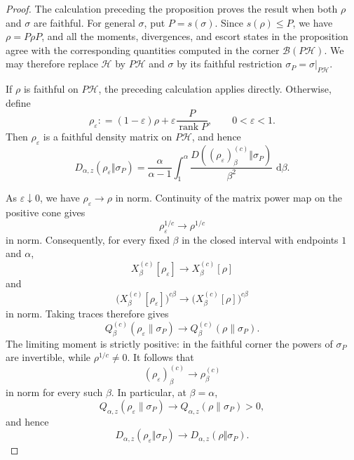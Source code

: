 \documentclass[12pt]{article}
\numberwithin{equation}{section}
\theoremstyle{definition}
\theoremstyle{remark}
\newcommand{\dd}{\,\mathrm d}
\newcommand{\?}{\overset{?}{=}}
\newcommand{\defeq}{\mathrel{\mathop:}=}
\newcommand{\cH}{\mathcal{H}}
\begin{document}
\begin{proof}
The calculation preceding the proposition proves the result when both
$\rho$ and $\sigma$ are faithful.  For general $\sigma$, put
$P=s(\sigma)$.  Since $s(\rho)\leq P$, we have $\rho=P\rho P$, and all
the moments, divergences, and escort states in the proposition agree
with the corresponding quantities computed in the corner
$\mathcal B(P\cH)$.  We may therefore replace $\cH$ by $P\cH$ and
$\sigma$ by its faithful restriction
$\sigma_P=\sigma\vert_{P\cH}$.

If $\rho$ is faithful on $P\cH$, the preceding calculation applies
directly.  Otherwise, define
\begin{equation}
  \rho_\varepsilon
  \defeq
  (1-\varepsilon)\rho
  +\varepsilon\frac{P}{\operatorname{rank}P},
  \qquad 0<\varepsilon<1.
  \label{eq:fd-faithful-regularization}
\end{equation}
Then $\rho_\varepsilon$ is a faithful density matrix on $P\cH$, and
hence
\begin{equation}
  D_{\alpha,z}(\rho_\varepsilon\Vert\sigma_P)
  =
  \frac{\alpha}{\alpha-1}
  \int_1^\alpha
  \frac{
    D((\rho_\varepsilon)_\beta^{(c)}\Vert\sigma_P)}
       {\beta^2}\,\dd\beta .
  \label{eq:fd-regularized-ray-integral}
\end{equation}

As $\varepsilon\downarrow0$, we have
$\rho_\varepsilon\to\rho$ in norm.  Continuity of the matrix power map
on the positive cone gives
\[
  \rho_\varepsilon^{1/c}\longrightarrow\rho^{1/c}
\]
in norm.  Consequently, for every fixed $\beta$ in the closed interval
with endpoints $1$ and $\alpha$,
\[
  X_\beta^{(c)}[\rho_\varepsilon]
  \longrightarrow
  X_\beta^{(c)}[\rho]
\]
and
\[
  \bigl(X_\beta^{(c)}[\rho_\varepsilon]\bigr)^{c\beta}
  \longrightarrow
  \bigl(X_\beta^{(c)}[\rho]\bigr)^{c\beta}
\]
in norm.  Taking traces therefore gives
\[
  Q_\beta^{(c)}(\rho_\varepsilon\|\sigma_P)
  \longrightarrow
  Q_\beta^{(c)}(\rho\|\sigma_P).
\]
The limiting moment is strictly positive: in the faithful corner the
powers of $\sigma_P$ are invertible, while $\rho^{1/c}\neq0$.  It
follows that
\[
  (\rho_\varepsilon)_\beta^{(c)}
  \longrightarrow
  \rho_\beta^{(c)}
\]
in norm for every such $\beta$.  In particular, at $\beta=\alpha$,
\[
  Q_{\alpha,z}(\rho_\varepsilon\|\sigma_P)
  \longrightarrow
  Q_{\alpha,z}(\rho\|\sigma_P)>0,
\]
and hence
\begin{equation}
  D_{\alpha,z}(\rho_\varepsilon\Vert\sigma_P)
  \longrightarrow
  D_{\alpha,z}(\rho\Vert\sigma_P).
  \label{eq:fd-regularized-divergence-limit}
\end{equation}


\end{proof}
\end{document}
